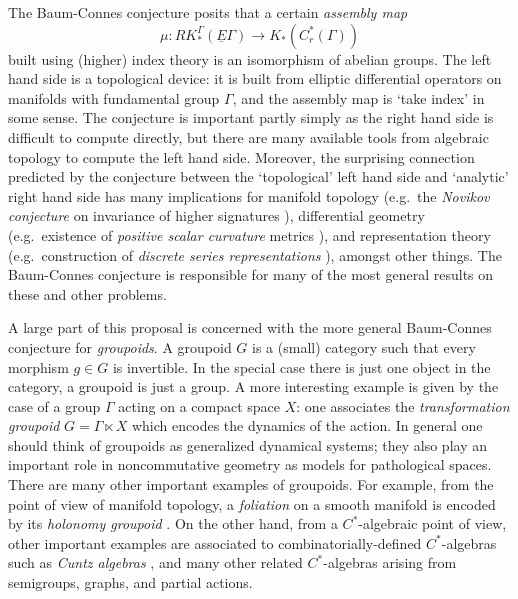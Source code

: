 The Baum-Connes conjecture \cite{Baum:1994pr} posits that a certain \emph{assembly map}
\begin{equation}\label{bc ass}
\mu:RK_*^\Gamma(\underline{E}\Gamma)\to K_*(C^*_r(\Gamma))
\end{equation}
built using (higher) index theory is an isomorphism of abelian groups.  The left hand side is a topological device: it is built from elliptic differential operators on manifolds with fundamental group $\Gamma$, and the assembly map is `take index' in some sense.   The conjecture is important partly simply as the right hand side is difficult to compute directly, but there are many available tools from algebraic topology to compute the left hand side.  Moreover, the surprising connection predicted by the conjecture between the `topological' left hand side and `analytic' right hand side has many implications for manifold topology (e.g.\ the \emph{Novikov conjecture} on invariance of higher signatures \cite{Ferry:1993xw}), differential geometry (e.g.\ existence of \emph{positive scalar curvature} metrics \cite{Rosenberg:1983qy}), and representation theory (e.g.\ construction of \emph{discrete series representations} \cite{Lafforgue:2002zl}), amongst other things.  The Baum-Connes conjecture is responsible for many of the most general results on these and other problems.  

A large part of this proposal is concerned with the more general Baum-Connes conjecture for \emph{groupoids}.  A groupoid $G$ is a (small) category such that every morphism $g\in G$ is invertible.  In the special case there is just one object in the category, a groupoid is just a group.  A more interesting example is given by the case of a group $\Gamma$ acting on a compact space $X$: one associates the \emph{transformation groupoid} $G=\Gamma\ltimes X$ which encodes the dynamics of the action.  In general one should think of groupoids as generalized dynamical systems; they also play an important role in noncommutative geometry as models for pathological spaces.   There are many other important examples of groupoids.  For example, from the point of view of manifold topology, a \emph{foliation} on a smooth manifold is encoded by its \emph{holonomy groupoid} \cite{Connes:1982ss}.  On the other hand, from a $C^*$-algebraic point of view, other important examples are associated to combinatorially-defined $C^*$-algebras such as \emph{Cuntz algebras} \cite{Renault:1980fk}, and many other related $C^*$-algebras arising from semigroups, graphs, and partial actions.  


